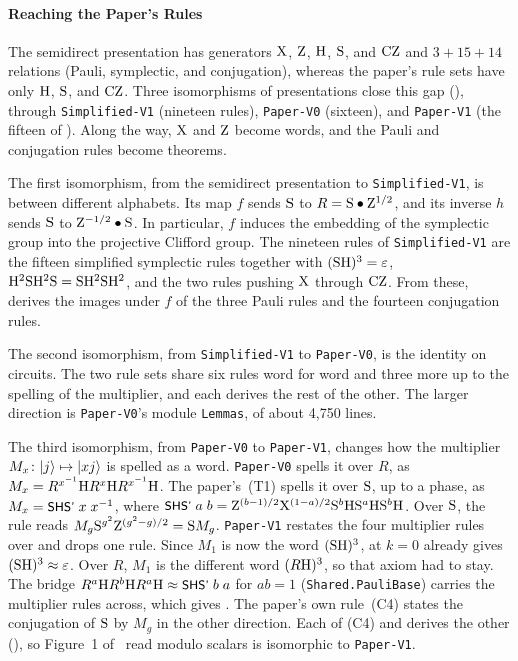 \documentclass[acmsmall,screen,nonacm]{acmart}
\begin{document}
\paragraph{Reaching the Paper's Rules} The semidirect presentation has generators $\mathrm{X}$, $\mathrm{Z}$, $\mathrm{H}$, $\mathrm{S}$, and $\mathrm{CZ}$ and $3 + 15 + 14$ relations (Pauli, symplectic, and conjugation), whereas the paper's rule sets have only $\mathrm{H}$, $\mathrm{S}$, and $\mathrm{CZ}$. Three isomorphisms of presentations close this gap (), through \texttt{Simplified-V1} (nineteen rules), \texttt{Paper-V0} (sixteen), and \texttt{Paper-V1} (the fifteen of ). Along the way, $\mathrm{X}$ and $\mathrm{Z}$ become words, and the Pauli and conjugation rules become theorems.

The first isomorphism, from the semidirect presentation to \texttt{Simplified-V1}, is between different alphabets. Its map $f$ sends $\mathrm{S}$ to $R = \mathrm{S} \bullet \mathrm{Z}^{1/2}$, and its inverse $h$ sends $\mathrm{S}$ to $\mathrm{Z}^{-1/2} \bullet \mathrm{S}$. In particular, $f$ induces the embedding of the symplectic group into the projective Clifford group. The nineteen rules of \texttt{Simplified-V1} are the fifteen simplified symplectic rules together with $(\mathrm{S}\mathrm{H})^3 = \varepsilon$, $\mathrm{H}^2\mathrm{S}\mathrm{H}^2\mathrm{S} = \mathrm{S}\mathrm{H}^2\mathrm{S}\mathrm{H}^2$, and the two rules pushing $\mathrm{X}$ through $\mathrm{CZ}$. From these,  derives the images under $f$ of the three Pauli rules and the fourteen conjugation rules.

The second isomorphism, from \texttt{Simplified-V1} to \texttt{Paper-V0}, is the identity on circuits. The two rule sets share six rules word for word and three more up to the spelling of the multiplier, and each derives the rest of the other. The larger direction is \texttt{Paper-V0}'s module \texttt{Lemmas}, of about 4{,}750 lines.

The third isomorphism, from \texttt{Paper-V0} to \texttt{Paper-V1}, changes how the multiplier $M_x\colon |j\rangle \mapsto |xj\rangle$ is spelled as a word. \texttt{Paper-V0} spells it over $R$, as $M_x = R^{x^{-1}}\mathrm{H} R^{x}\mathrm{H} R^{x^{-1}}\mathrm{H}$. The paper's~(T1) spells it over $\mathrm{S}$, up to a phase, as $M_x = \mbox{\textsf{\small SHS'}}\;x\;x^{-1}$, where $\mbox{\textsf{\small SHS'}}\;a\;b = \mathrm{Z}^{(b-1)/2}\mathrm{X}^{(1-a)/2}\mathrm{S}^{b}\mathrm{H}\mathrm{S}^{a}\mathrm{H}\mathrm{S}^{b}\mathrm{H}$. Over $\mathrm{S}$, the rule  reads $M_g\mathrm{S}^{g^2}\mathrm{Z}^{(g^2-g)/2} = \mathrm{S} M_g$. \texttt{Paper-V1} restates the four multiplier rules over  and drops one rule. Since $M_1$ is now the word $(\mathrm{S}\mathrm{H})^3$,  at $k = 0$ already gives $(\mathrm{S}\mathrm{H})^3 \approx \varepsilon$. Over $R$, $M_1$ is the different word $(R\mathrm{H})^3$, so that axiom had to stay. The bridge $R^{a}\mathrm{H} R^{b}\mathrm{H} R^{a}\mathrm{H} \approx \mbox{\textsf{\small SHS'}}\;b\;a$ for $ab = 1$ (\texttt{Shared.PauliBase}) carries the multiplier rules across, which gives . The paper's own rule~(C4) states the conjugation of $\mathrm{S}$ by $M_g$ in the other direction. Each of (C4) and  derives the other (), so Figure~1 of~\quditcite{} read modulo scalars is isomorphic to \texttt{Paper-V1}.
\end{document}
